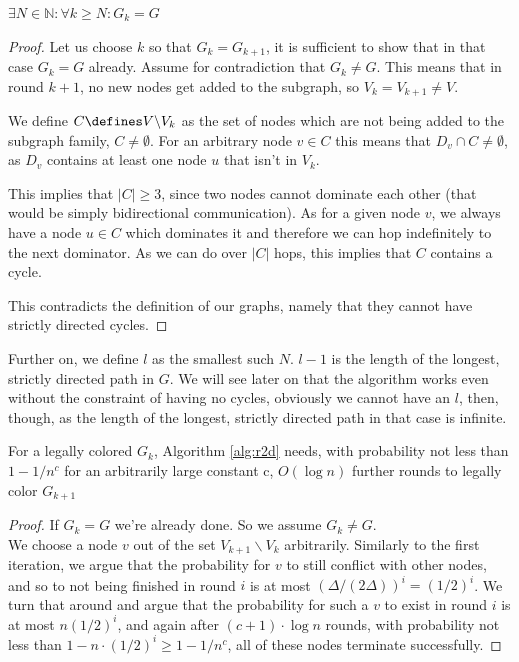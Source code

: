 \begin{lemma}
\label{theorem:r2dlaenge}
	$\exists N \in  \mathbb{N} : \forall k \geq N : G_k = G$
\end{lemma}
\begin{proof}
	Let us choose $k$ so that $G_k = G_{k+1}$, it is sufficient to show that in that case $G_k = G$ already.
	Assume for contradiction that $G_k \neq G$. This means that in round $k+1$, no new nodes get added to the subgraph, so $V_k = V_{k+1} \neq V$. 
	
	We define $C \defines V \backslash V_k$ as the set of nodes which are not being added to the subgraph family, $C \neq \emptyset$. For an arbitrary node $v \in C$ this means that $D_v \cap C \neq \emptyset$, as $D_v$ contains at least one node $u$ that isn't in $V_k$.
	
	This implies that $|C| \geq 3$, since two nodes cannot dominate each other (that would be simply bidirectional communication). As for a given node $v$, we always have a node $u \in C$ which dominates it and therefore we can hop indefinitely to the next dominator. As we can do over $|C|$ hops, this implies that $C$ contains a cycle.
	
	This contradicts the definition of our graphs, namely that they cannot have strictly directed cycles.
\end{proof}
Further on, we define $l$ as the smallest such $N$. $l-1$ is the length of the longest, strictly directed path in $G$. We will see later on that the algorithm works even without the constraint of having no cycles, obviously we cannot have an $l$, then, though, as the length of the longest, strictly directed path in that case is infinite. 

\begin{lemma}
\label{theorem:r2diteration}
	For a legally colored $G_k$, Algorithm \ref{alg:r2d} needs, with probability not less than $1-1/n^c$ for an arbitrarily large constant c, $O(\log n)$ further rounds to legally color $G_{k+1}$
\end{lemma}
\begin{proof}
	If $G_k = G$ we're already done.
	So we assume $G_k \neq G$.\\
	We choose a node $v$ out of the set $V_{k+1}\backslash V_k$ arbitrarily. Similarly to the first iteration, we argue that the probability for $v$ to still conflict with other nodes, and so to not being finished in round $i$ is at most $(\Delta /(2\Delta))^i = (1/2)^i$. We turn that around and argue that the probability for such a $v$ to exist in round $i$ is at most $n (1/2)^i$, and again after $(c+1) \cdot \log n$ rounds, with probability not less than $1-n \cdot (1/2)^i \geq 1-1/n^c$, all of these nodes terminate successfully.
\end{proof}

